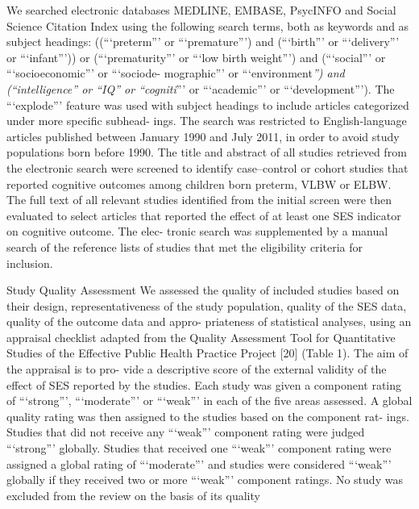 \documentclass[english,man]{apa6}
\theoremstyle{definition}
\theoremstyle{definition}
\theoremstyle{definition}
\theoremstyle{remark}
\begin{document}
We searched electronic databases MEDLINE, EMBASE, PsycINFO and Social
Science Citation Index using the following search terms, both as
keywords and as subject headings: ((\enquote{`preterm}' or
\enquote{`premature}') and (\enquote{`birth}' or \enquote{`delivery}' or
\enquote{`infant}')) or (\enquote{`prematurity}' or \enquote{`low birth
weight}') and (\enquote{`social}' or \enquote{`socioeconomic}' or
\enquote{`sociode- mographic}' or \enquote{`environment\emph{'') and
(``intelligence'' or ``IQ'' or ``cogniti}}' or \enquote{`academic}' or
\enquote{`development}'). The \enquote{`explode}' feature was used with
subject headings to include articles categorized under more specific
subhead- ings. The search was restricted to English-language articles
published between January 1990 and July 2011, in order to avoid study
populations born before 1990. The title and abstract of all studies
retrieved from the electronic search were screened to identify
case--control or cohort studies that reported cognitive outcomes among
children born preterm, VLBW or ELBW. The full text of all relevant
studies identified from the initial screen were then evaluated to select
articles that reported the effect of at least one SES indicator on
cognitive outcome. The elec- tronic search was supplemented by a manual
search of the reference lists of studies that met the eligibility
criteria for inclusion.

Study Quality Assessment We assessed the quality of included studies
based on their design, representativeness of the study population,
quality of the SES data, quality of the outcome data and appro-
priateness of statistical analyses, using an appraisal checklist adapted
from the Quality Assessment Tool for Quantitative Studies of the
Effective Public Health Practice Project {[}20{]} (Table 1). The aim of
the appraisal is to pro- vide a descriptive score of the external
validity of the effect of SES reported by the studies. Each study was
given a component rating of \enquote{`strong}', \enquote{`moderate}' or
\enquote{`weak}' in each of the five areas assessed. A global quality
rating was then assigned to the studies based on the component rat-
ings. Studies that did not receive any \enquote{`weak}' component rating
were judged \enquote{`strong}' globally. Studies that received one
\enquote{`weak}' component rating were assigned a global rating of
\enquote{`moderate}' and studies were considered \enquote{`weak}'
globally if they received two or more \enquote{`weak}' component
ratings. No study was excluded from the review on the basis of its
quality
\end{document}
